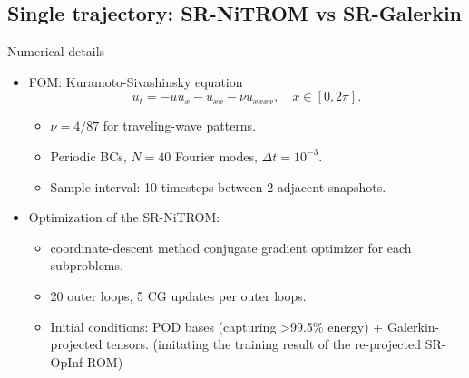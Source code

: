 \documentclass[presentation]{beamer}
\begin{document}
\subsection{Single trajectory: SR-NiTROM vs SR-Galerkin}
\label{sec:org591bfcd}
\begin{frame}[label={sec:orgcef012f}]{Numerical details}
\begin{itemize}[<+->]
\item FOM: Kuramoto-Sivashinsky equation
\begin{equation}
  \label{eq:6}
  u_{t} = -uu_{x} - u_{xx} - \nu u_{xxxx}, \quad x\in[0, 2\pi].
\end{equation}
\begin{itemize}
\item \(\nu = 4/87\) for traveling-wave patterns.
\item Periodic BCs, \(N=40\) Fourier modes, \(\Delta t = 10^{-3}\).
\item Sample interval: 10 timesteps between 2 adjacent snapshots.
\end{itemize}

\item Optimization of the SR-NiTROM:
\begin{itemize}
\item coordinate-descent method
conjugate gradient optimizer for each subproblems.
\item 20 outer loops, 5 CG updates per outer loops.
\item Initial conditions: POD bases (capturing >99.5\% energy) + Galerkin-projected tensors.
(imitating the training result of the re-projected SR-OpInf ROM)
\end{itemize}
\end{itemize}
\end{frame}
\end{document}
